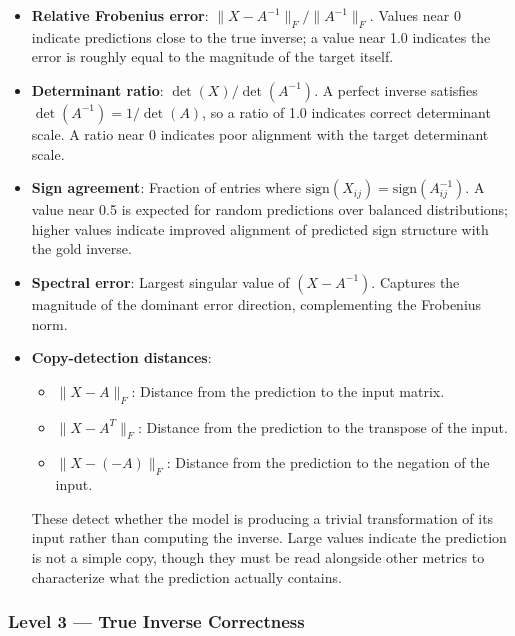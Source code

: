 \begin{itemize}
    \item \textbf{Relative Frobenius error}: $\|X - A^{-1}\|_F / \|A^{-1}\|_F$. Values near 0 indicate predictions close to the true inverse; a value near 1.0 indicates the error is roughly equal to the magnitude of the target itself.

    \item \textbf{Determinant ratio}: $\det(X) / \det(A^{-1})$. A perfect inverse satisfies $\det(A^{-1}) = 1/\det(A)$, so a ratio of 1.0 indicates correct determinant scale. A ratio near 0 indicates poor alignment with the target determinant scale.

    \item \textbf{Sign agreement}: Fraction of entries where $\mathrm{sign}(X_{ij}) = \mathrm{sign}(A^{-1}_{ij})$. A value near 0.5 is expected for random predictions over balanced distributions; higher values indicate improved alignment of predicted sign structure with the gold inverse.

    \item \textbf{Spectral error}: Largest singular value of $(X - A^{-1})$. Captures the magnitude of the dominant error direction, complementing the Frobenius norm.

    \item \textbf{Copy-detection distances}:
    \begin{itemize}
        \item $\|X - A\|_F$: Distance from the prediction to the input matrix.
        \item $\|X - A^T\|_F$: Distance from the prediction to the transpose of the input.
        \item $\|X - (-A)\|_F$: Distance from the prediction to the negation of the input.
    \end{itemize}
    These detect whether the model is producing a trivial transformation of its input rather than computing the inverse. Large values indicate the prediction is not a simple copy, though they must be read alongside other metrics to characterize what the prediction actually contains.
\end{itemize}

\subsubsection{Level 3 --- True Inverse Correctness}

